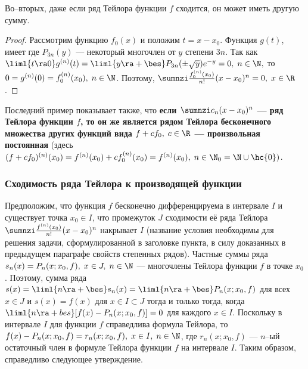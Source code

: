 \documentclass[a4paper]{article}
\begin{document}
Во--вторых, даже если ряд Тейлора функции $f$ сходится, он может
иметь другую сумму.

\begin{proof}
Рассмотрим функцию $f_0(x)$  и положим $t=x-x_0$. Функция $g(t)$,
 имеет  где $P_{3n}(y)$ ---
некоторый многочлен от $y$ степени $3n$. Так как $\liml{t\ra0}
g^{(n)}(t) = \liml{y\ra+\bes} P_{3n}(\pm\sqrt{y}) e^{-y} = 0, \;
n\in\N,$ то $0=g^{(n)}(0) = f^{(n)}_0 (x_0), \; n\in\N$. Поэтому,
$\sumnzi \frac{f^{(n)}_0(x_0)}{n!}(x-x_0)^n=0, \; x\in\R$.
\end{proof}

Последний пример показывает также, что \textbf{если $\sumnzi
c_n(x-x_0)^n$ --- ряд Тейлора функции $f$, то он же является рядом
Тейлора бесконечного множества других функций вида $f+cf_0, \;
c\in\R$ --- произвольная постоянная} (здесь $(f+cf_0)^{(n)}(x_0) =
f^{(n)}(x_0) + cf^{(n)}_0(x_0) = f^{(n)}(x_0), \;
n\in\N_0=\N\cup\hc{0})$.

\subsubsection{Сходимость ряда Тейлора к производящей функции}

Предположим, что функция $f$ бесконечно дифференцируема в интервале
$I$ и существует точка $x_0\in I$, что промежуток $J$ сходимости её
ряда Тейлора $\sumnzi \frac{f^{(n)}(x_0)}{n!}(x-x_0)^n$ накрывает
$I$ (название условия необходимы для решения задачи,
сформулированной в заголовке пункта, в силу доказанных в предыдущем
параграфе свойств степенных рядов). Частные суммы ряда $s_n(x) =
P_n(x;x_0,f), \; x\in J, \; n\in\N$ --- многочлены Тейлора функции
$f$ в точке $x_0$. Поэтому, сумма ряда $s(x)=\liml{n\ra+\bes} s_n(x)
= \liml{n\ra+\bes} P_n(x;x_0,f)$ для всех $x\in J$ и $s(x)=f(x)$ для
$x\in I\subset J$ тогда и только тогда, когда $\liml{n\ra+bes}
[f(x)-P_n(x;x_0,f)]=0$ для каждого $x\in I$. Поскольку в интервале
$I$ для функции $f$ справедлива формула Тейлора, то $f(x) -
P_n(x;x_0,f) = r_n(x;x_0,f), \; x\in I, \; n\in\N$, где
$r_n(x;x_0,f)$ --- $n$--ый остаточный член в формуле Тейлора функции
$f$ на интервале $I$. Таким образом, справедливо следующее
утверждение.
\end{document}
